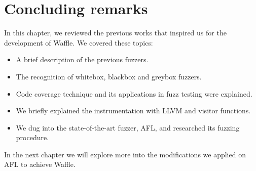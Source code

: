 \section{Concluding remarks}

In this chapter, we reviewed the previous works that inspired us for the development of Waffle. We covered these topics:

\begin{itemize}
    \item A brief description of the previous fuzzers.
    \item The recognition of whitebox, blackbox and greybox fuzzers.
    \item Code coverage technique and its applications in fuzz testing were explained.
    \item We briefly explained the instrumentation with LLVM and visitor functions.
    \item We dug into the state-of-the-art fuzzer, AFL, and researched its fuzzing procedure.
\end{itemize}

In the next chapter we will explore more into the modifications we applied on AFL to achieve Waffle.